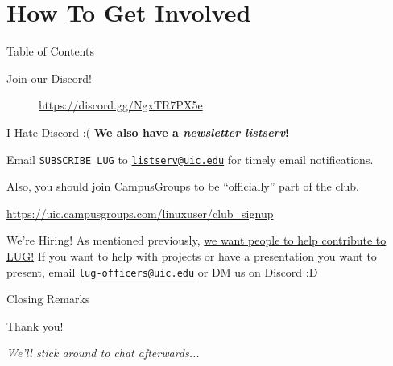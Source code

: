 \documentclass{beamer}
\begin{document}
\section{How To Get Involved}
\begin{frame}{Table of Contents}
	\tableofcontents[currentsection]
\end{frame}

\begin{frame}{Join our Discord!}
	\begin{figure}
		\centering
		
		\caption{\url{https://discord.gg/NgxTR7PX5e}}
	\end{figure}
\end{frame}

\begin{frame}{I Hate Discord \>:(}
	\textbf{We also have a \textit{newsletter listserv}!}

	Email \texttt{SUBSCRIBE LUG} to
	\href{mailto:listserv@uic.edu}{\texttt{listserv@uic.edu}} for timely
	email notifications.

	Also, you should join CampusGroups to be ``officially'' part of the club.

	\url{https://uic.campusgroups.com/linuxuser/club\_signup}
\end{frame}

\begin{frame}{We're Hiring!}
	As mentioned previously, \underline{we want people to help contribute
		to LUG!} \pause If you want to help with projects or have a
	presentation you want to present, email
	\href{mailto:lug-officers@uic.edu}{\texttt{lug-officers@uic.edu}} or DM
	us on Discord :D
\end{frame}

\begin{frame}{Closing Remarks}
	\begin{center}
		{\Huge Thank you!}

		\textit{We'll stick around to chat afterwards...}
	\end{center}
\end{frame}
\end{document}
